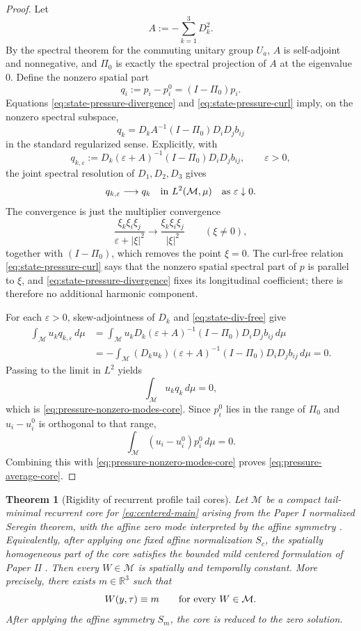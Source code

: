 \documentclass[11pt]{amsart}
\numberwithin{equation}{section}
\theoremstyle{plain}
\newtheorem{theorem}{Theorem}[section]
\theoremstyle{definition}
\theoremstyle{remark}
\newcommand{\R}{\mathbb R}
\newcommand{\calM}{\mathcal M}
\begin{document}
\begin{proof}
Let
\[
   A:=-\sum_{k=1}^3D_k^2.
\]
By the spectral theorem for the commuting unitary group \(U_a\), \(A\) is
self-adjoint and nonnegative, and \(\Pi_0\) is exactly the spectral projection
of \(A\) at the eigenvalue \(0\).  Define the nonzero spatial part
\[
   q_i:=p_i-p_i^0=(I-\Pi_0)p_i .
\]
Equations \eqref{eq:state-pressure-divergence} and
\eqref{eq:state-pressure-curl} imply, on the nonzero spectral subspace,
\[
   q_k
   =
   D_kA^{-1}(I-\Pi_0)D_iD_jb_{ij}
\]
in the standard regularized sense.  Explicitly, with
\[
   q_{k,\varepsilon}
   :=
   D_k(\varepsilon+A)^{-1}(I-\Pi_0)D_iD_jb_{ij},
   \qquad \varepsilon>0,
\]
the joint spectral resolution of \(D_1,D_2,D_3\) gives
\[
   q_{k,\varepsilon}\longrightarrow q_k
   \quad\hbox{in }L^2(\calM,\mu)
   \quad\hbox{as }\varepsilon\downarrow0.
\]
The convergence is just the multiplier convergence
\[
   \frac{\xi_k\xi_i\xi_j}{\varepsilon+|\xi|^2}
      \longrightarrow
   \frac{\xi_k\xi_i\xi_j}{|\xi|^2}
   \qquad (\xi\ne0),
\]
together with \((I-\Pi_0)\), which removes the point \(\xi=0\).  The
curl-free relation \eqref{eq:state-pressure-curl} says that the nonzero
spatial spectral part of \(p\) is parallel to \(\xi\), and
\eqref{eq:state-pressure-divergence} fixes its longitudinal coefficient;
there is therefore no additional harmonic component.

For each \(\varepsilon>0\), skew-adjointness of \(D_k\) and
\eqref{eq:state-div-free} give
\begin{align*}
   \int_{\calM}u_k q_{k,\varepsilon}\,d\mu
   &=
   \int_{\calM}
      u_kD_k(\varepsilon+A)^{-1}(I-\Pi_0)D_iD_jb_{ij}\,d\mu \\
   &=
   -\int_{\calM}
      (D_ku_k)(\varepsilon+A)^{-1}(I-\Pi_0)D_iD_jb_{ij}\,d\mu
   =0 .
\end{align*}
Passing to the limit in \(L^2\) yields
\[
   \int_{\calM}u_k q_k\,d\mu=0,
\]
which is \eqref{eq:pressure-nonzero-modes-core}.  Since \(p_i^0\) lies in the
range of \(\Pi_0\) and \(u_i-u_i^0\) is orthogonal to that range,
\[
   \int_{\calM}(u_i-u_i^0)p_i^0\,d\mu=0 .
\]
Combining this with \eqref{eq:pressure-nonzero-modes-core} proves
\eqref{eq:pressure-average-core}.
\end{proof}

\begin{theorem}[Rigidity of recurrent profile tail cores]
\label{thm:recurrent-tail-core-rigidity}
Let \(\calM\) be a compact tail-minimal recurrent core for
\eqref{eq:centered-main} arising from the Paper I normalized Seregin theorem,
with the affine zero mode interpreted by the affine symmetry
.  Equivalently, after applying one fixed affine
normalization \(S_c\), the spatially homogeneous part of the core satisfies
the bounded mild centered formulation of Paper II
\cite[Definition~\emph{Bounded mild ancient solution}]{DuranPaperII}.  Then
every \(W\in\calM\) is spatially and temporally constant.
More precisely, there exists \(m\in\R^3\) such that
\[
   W(y,\tau)\equiv m
   \qquad
   \hbox{for every }W\in\calM.
\]
After applying the affine symmetry \(S_m\), the core is reduced to the zero
solution.
\end{theorem}
\end{document}
